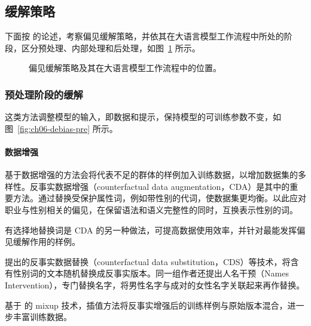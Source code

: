 \subsection{缓解策略}
\label{sec:ch06-debiasing}
下面按 的论述，考察偏见缓解策略，并依其在大语言模型工作流程中所处的阶段，区分预处理、内部处理和后处理，如图~\ref{fig:ch06-debiasing} 所示。

\begin{figure}[!htbp]
\centering

\caption{偏见缓解策略及其在大语言模型工作流程中的位置。}
\label{fig:ch06-debiasing}
\end{figure}

\subsubsection{预处理阶段的缓解}
这类方法调整模型的输入，即数据和提示，保持模型的可训练参数不变，如图~\ref{fig:ch06-debias-pre} 所示。


\paragraph*{数据增强}
基于数据增强的方法会将代表不足的群体的样例加入训练数据，以增加数据集的多样性。反事实数据增强（counterfactual data augmentation，CDA）是其中的重要方法。通过替换受保护属性词，例如带性别的代词，使数据集更均衡。以此应对职业与性别相关的偏见，在保留语法和语义完整性的同时，互换表示性别的词。

有选择地替换词是 CDA 的另一种做法，可提高数据使用效率，并针对最能发挥偏见缓解作用的样例。

\begin{practicaltip}
提出的反事实数据替换（counterfactual data substitution，CDS）等技术，将含有性别词的文本随机替换成反事实版本。同一组作者还提出人名干预（Names Intervention），专门替换名字，将男性名字与成对的女性名字关联起来再作替换。

基于 的 mixup 技术，插值方法将反事实增强后的训练样例与原始版本混合，进一步丰富训练数据。
\end{practicaltip}

